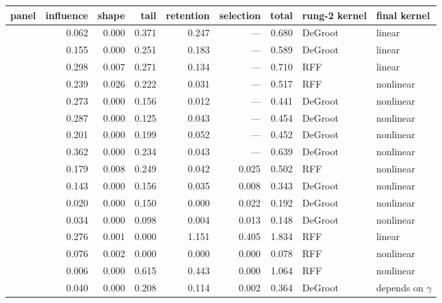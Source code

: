 \begin{tabular}{lrrrrrrll}
\toprule
panel & influence & shape & tail & retention & selection & total & rung-2 kernel & final kernel \\
\midrule
\adamsLo{} & 0.062 & 0.000 & 0.371 & 0.247 & --- & 0.680 & DeGroot & linear \\
\adamsMid{} & 0.155 & 0.000 & 0.251 & 0.183 & --- & 0.589 & DeGroot & linear \\
\adamsHi{} & 0.298 & 0.007 & 0.271 & 0.134 & --- & 0.710 & RFF & linear \\
\takacsCtl{} & 0.239 & 0.026 & 0.222 & 0.031 & --- & 0.517 & RFF & nonlinear \\
\takacsDis{} & 0.273 & 0.000 & 0.156 & 0.012 & --- & 0.441 & DeGroot & nonlinear \\
\takacsInt{} & 0.287 & 0.000 & 0.125 & 0.043 & --- & 0.454 & DeGroot & nonlinear \\
\takacsOne{} & 0.201 & 0.000 & 0.199 & 0.052 & --- & 0.452 & DeGroot & nonlinear \\
\becker{} & 0.362 & 0.000 & 0.234 & 0.043 & --- & 0.639 & DeGroot & nonlinear \\
\vkg{} & 0.179 & 0.008 & 0.249 & 0.042 & 0.025 & 0.502 & RFF & nonlinear \\
\vkc{} & 0.143 & 0.000 & 0.156 & 0.035 & 0.008 & 0.343 & DeGroot & nonlinear \\
\senate{} & 0.020 & 0.000 & 0.150 & 0.000 & 0.022 & 0.192 & DeGroot & nonlinear \\
\house{} & 0.034 & 0.000 & 0.098 & 0.004 & 0.013 & 0.148 & DeGroot & nonlinear \\
\cmv{} & 0.276 & 0.001 & 0.000 & 1.151 & 0.405 & 1.834 & RFF & linear \\
\spinos{} & 0.076 & 0.002 & 0.000 & 0.000 & 0.000 & 0.078 & RFF & nonlinear \\
\kozitsin{} & 0.006 & 0.000 & 0.615 & 0.443 & 0.000 & 1.064 & RFF & nonlinear \\
\markets{} & 0.040 & 0.000 & 0.208 & 0.114 & 0.002 & 0.364 & DeGroot & depends on $\gamma$ \\
\bottomrule
\end{tabular}
